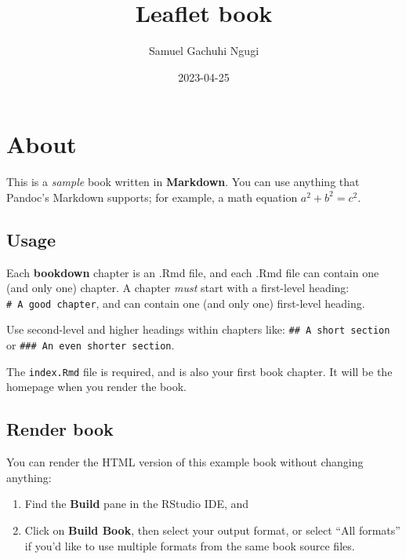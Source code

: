 \documentclass[
]{book}
\title{Leaflet book}
\author{Samuel Gachuhi Ngugi}
\date{2023-04-25}
\theoremstyle{definition}
\theoremstyle{definition}
\theoremstyle{definition}
\theoremstyle{definition}
\theoremstyle{remark}
\begin{document}
\maketitle

{
\setcounter{tocdepth}{1}
\tableofcontents
}
\hypertarget{about}{%
\chapter*{About}\label{about}}

This is a \emph{sample} book written in \textbf{Markdown}. You can use anything that Pandoc's Markdown supports; for example, a math equation \(a^2 + b^2 = c^2\).

\hypertarget{usage}{%
\section*{Usage}\label{usage}}

Each \textbf{bookdown} chapter is an .Rmd file, and each .Rmd file can contain one (and only one) chapter. A chapter \emph{must} start with a first-level heading: \texttt{\#\ A\ good\ chapter}, and can contain one (and only one) first-level heading.

Use second-level and higher headings within chapters like: \texttt{\#\#\ A\ short\ section} or \texttt{\#\#\#\ An\ even\ shorter\ section}.

The \texttt{index.Rmd} file is required, and is also your first book chapter. It will be the homepage when you render the book.

\hypertarget{render-book}{%
\section*{Render book}\label{render-book}}

You can render the HTML version of this example book without changing anything:

\begin{enumerate}
\def\labelenumi{\arabic{enumi}.}
\item
  Find the \textbf{Build} pane in the RStudio IDE, and
\item
  Click on \textbf{Build Book}, then select your output format, or select ``All formats'' if you'd like to use multiple formats from the same book source files.
\end{enumerate}
\end{document}
